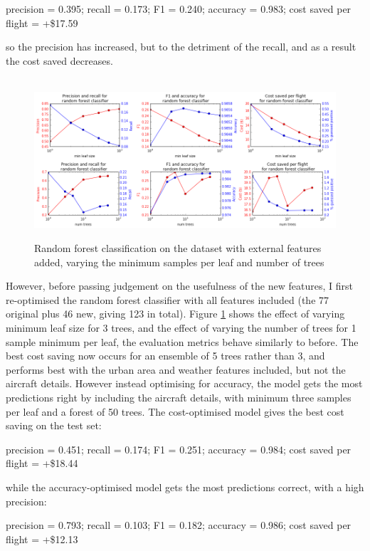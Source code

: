 \documentclass[a4paper]{article}
\begin{document}
\noindent precision = 0.395; recall = 0.173; F1 = 0.240; accuracy = 0.983; cost saved per flight = +\$17.59

\noindent so the precision has increased, but to the detriment of the recall, and as a result the cost saved decreases.

\begin{figure}[h]
\centering
\hbox{\hspace{-0.5in}
\includegraphics[width=1.15\textwidth]{../figures/classification/rf2_reg_leaves.png}}
\caption{Random forest classification on the dataset with external features added, varying the minimum samples per leaf and number of trees}
\label{randfor2}
\end{figure}

However, before passing judgement on the usefulness of the new features, I first re-optimised the random forest classifier with all features included (the 77 original plus 46 new, giving 123 in total). Figure \ref{randfor2} shows the effect of varying minimum leaf size for 3 trees, and the effect of varying the number of trees for 1 sample minimum per leaf, the evaluation metrics behave similarly to before. The best cost saving now occurs for an ensemble of 5 trees rather than 3, and performs best with the urban area and weather features included, but not the aircraft details. However instead optimising for accuracy, the model gets the most predictions right by including the aircraft details, with minimum three samples per leaf and a forest of 50 trees. The cost-optimised model gives the best cost saving on the test set:

\noindent precision = 0.451; recall = 0.174; F1 = 0.251; accuracy = 0.984; cost saved per flight = +\$18.44

\noindent while the accuracy-optimised model gets the most predictions correct, with a high precision:

\noindent precision = 0.793; recall = 0.103; F1 = 0.182; accuracy = 0.986; cost saved per flight = +\$12.13
\end{document}
